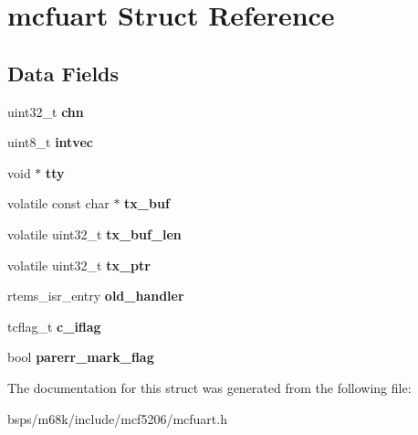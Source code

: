 \hypertarget{structmcfuart}{}\section{mcfuart Struct Reference}
\label{structmcfuart}
\subsection*{Data Fields}
\begin{DoxyCompactItemize}
\item 
\mbox{\label{structmcfuart_ac86186cdd98bbd7ee26bf942c3609654}} 
uint32\+\_\+t {\bfseries chn}
\item 
\mbox{\label{structmcfuart_a203b49f7daed061d1fac2f7b77527fdb}} 
uint8\+\_\+t {\bfseries intvec}
\item 
\mbox{\label{structmcfuart_ab2b1c57a213cdfe5ded2d1dee0f804e4}} 
void $\ast$ {\bfseries tty}
\item 
\mbox{\label{structmcfuart_a240b08c21f865a0ad103ef11d7d32caa}} 
volatile const char $\ast$ {\bfseries tx\+\_\+buf}
\item 
\mbox{\label{structmcfuart_a8640a81389cb6feeb7fbca067e680b44}} 
volatile uint32\+\_\+t {\bfseries tx\+\_\+buf\+\_\+len}
\item 
\mbox{\label{structmcfuart_ab1ca2daa7f7c919c0cba38aafc518fe5}} 
volatile uint32\+\_\+t {\bfseries tx\+\_\+ptr}
\item 
\mbox{\label{structmcfuart_ab64cd5ffe04d0db87634fc6f406f56e5}} 
rtems\+\_\+isr\+\_\+entry {\bfseries old\+\_\+handler}
\item 
\mbox{\label{structmcfuart_adc81efb7021eacb456be4251bd277502}} 
tcflag\+\_\+t {\bfseries c\+\_\+iflag}
\item 
\mbox{\label{structmcfuart_a3b3cefbb285776fe406c1b897bbac521}} 
bool {\bfseries parerr\+\_\+mark\+\_\+flag}
\end{DoxyCompactItemize}


The documentation for this struct was generated from the following file\+:\begin{DoxyCompactItemize}
\item 
bsps/m68k/include/mcf5206/mcfuart.\+h\end{DoxyCompactItemize}
